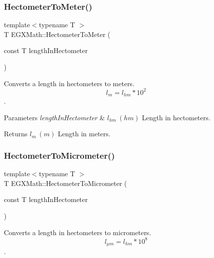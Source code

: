 \subsubsection{\texorpdfstring{Hectometer\+To\+Meter()}{HectometerToMeter()}}
{\footnotesize\ttfamily template$<$typename T $>$ \\
T E\+G\+X\+Math\+::\+Hectometer\+To\+Meter (\begin{DoxyParamCaption}\item[{const T}]{length\+In\+Hectometer }\end{DoxyParamCaption})}



Converts a length in hectometers to meters. \[ l_{m}=l_{hm} * 10^{2} \]. 


\begin{DoxyParams}{Parameters}
{\em length\+In\+Hectometer} & $ l_{hm}\ (hm)$ Length in hectometers. \\
\hline
\end{DoxyParams}
\begin{DoxyReturn}{Returns}
$ l_{m}\ (m)$ Length in meters. 
\end{DoxyReturn}
\mbox{\label{group___e_g_x_math-_conversions-_length_conversions-_hectometer-_s_i_ga3f5229b11d79e20007ac9320a317272a}} 
\subsubsection{\texorpdfstring{Hectometer\+To\+Micrometer()}{HectometerToMicrometer()}}
{\footnotesize\ttfamily template$<$typename T $>$ \\
T E\+G\+X\+Math\+::\+Hectometer\+To\+Micrometer (\begin{DoxyParamCaption}\item[{const T}]{length\+In\+Hectometer }\end{DoxyParamCaption})}



Converts a length in hectometers to micrometers. \[ l_{\mu m}=l_{hm} * 10^{8} \]. 


